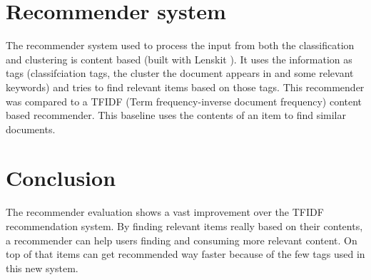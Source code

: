 \documentclass[twocolumn]{phdsymp} %
\begin{document}
\section{Recommender system}
The recommender system used to process the input from both the classification and clustering is content based (built with Lenskit \cite{Ekstrand2011}). It uses the information as tags (classifciation tags, the cluster the document appears in and some relevant keywords) and tries to find relevant items based on those tags. This recommender was compared to a TFIDF (Term frequency-inverse document frequency) content based recommender. This baseline uses the contents of an item to find similar documents.

\section{Conclusion}
The recommender evaluation shows a vast improvement over the TFIDF recommendation system. By finding relevant items really based on their contents, a recommender can help users finding and consuming more relevant content. On top of that items can get recommended way faster because of the few tags used in this new system. 


{}  %
\end{document}
